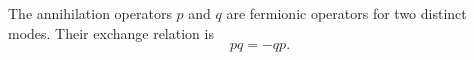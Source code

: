 \documentclass{article}
\begin{document}
The annihilation operators $p$ and $q$ are fermionic operators for two
distinct modes.  Their exchange relation is
\begin{equation}
p q = -q p .
\label{eq:fermion-exchange}
\end{equation}
\end{document}
